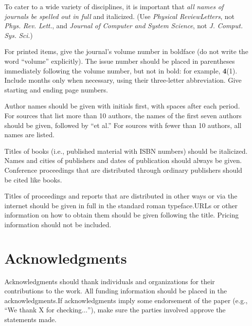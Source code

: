 \documentclass{article}
\begin{document}
To cater to a wide variety of disciplines, it is important that \textit{all names of journals be spelled out in full} and italicized. (Use \textit{Physical ReviewLetters}, not\textit{ Phys. Rev. Lett.}, and \textit{Journal of Computer and System Science}, not \textit{J. Comput. Sys. Sci.}) 

For printed items, give the journal{'}s volume number in boldface (do not write the word {``}volume{''} explicitly). The issue number should be placed in parentheses immediately following the volume number, but not in bold: for example, \textbf{4}(1). Include months only when necessary, using their three-letter abbreviation. Give starting and ending page numbers.

Author names should be given with initials first, with spaces after each period. For sources that list more than 10 authors, the names of the first seven authors should be given, followed by {``}et al.{''} For sources with fewer than 10 authors, all names are listed.

Titles of books (i.e., published material with ISBN numbers) should be italicized. Names and cities of publishers and dates of publication should always be given. Conference proceedings that are distributed through ordinary publishers should be cited like books. 

Titles of proceedings and reports that are distributed in other ways or via the internet should be given in full in the standard roman typeface.URLs or other information on how to obtain them should be given following the title. Pricing information should not be included.

\section*{Acknowledgments}

Acknowledgments should thank individuals and organizations for their contributions to the work. All funding information should be placed in the acknowledgments.If acknowledgments imply some endorsement of the paper (e.g., {``}We thank X for checking\(\ldots\){''}), make sure the parties involved approve the statements made.
\end{document}
